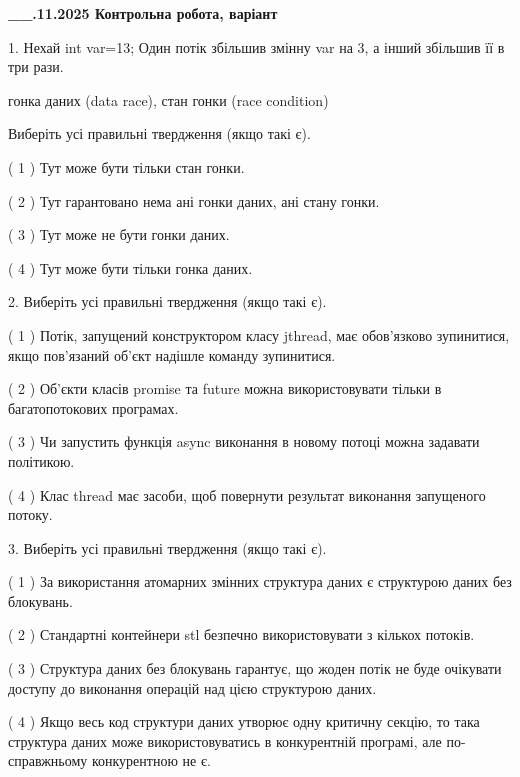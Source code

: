 \documentclass[12pt, ukrainian]{article}
\begin{document}
\newpage
\begin {large}

\textbf{\_\_.11.2025 Контрольна робота, варіант  }\par


{
1. Нехай int var=13; Один потік збільшив змінну var на 3, а інший збільшив її в три рази.

гонка даних (data race), стан гонки (race condition)

Виберіть усі правильні твердження (якщо такі є).\par
\vspace{2mm}
( 1 ) Тут може бути тільки стан гонки.%

( 2 ) Тут гарантовано нема ані гонки даних, ані стану гонки.%

( 3 ) Тут може не бути гонки даних.%

( 4 ) Тут може бути тільки гонка даних.%


2. Виберіть усі правильні твердження (якщо такі є).\par
\vspace{2mm}

( 1 ) Потік, запущений конструктором класу jthread, має обов’язково зупинитися, якщо пов’язаний об’єкт надішле команду зупинитися.%

( 2 ) Об’єкти класів promise та future можна використовувати тільки в багатопотокових програмах.%

( 3 ) Чи запустить функція  async виконання в новому потоці можна задавати політикою.%

( 4 ) Клас thread має засоби, щоб повернути результат виконання запущеного потоку.%


3. Виберіть усі правильні твердження (якщо такі є).\par


( 1 ) За використання атомарних змінних структура даних є структурою даних без блокувань.%

( 2 ) Стандартні контейнери stl безпечно використовувати з кількох потоків.%

( 3 ) Структура даних без блокувань гарантує, що жоден потік не буде очікувати доступу до виконання операцій над цією структурою даних.%

( 4 ) Якщо весь код структури даних утворює одну критичну секцію, то така структура даних може використовуватись в конкурентній програмі, але по-справжньо\-му конкурентною не є.%


}
\end{large}
\end{document}
